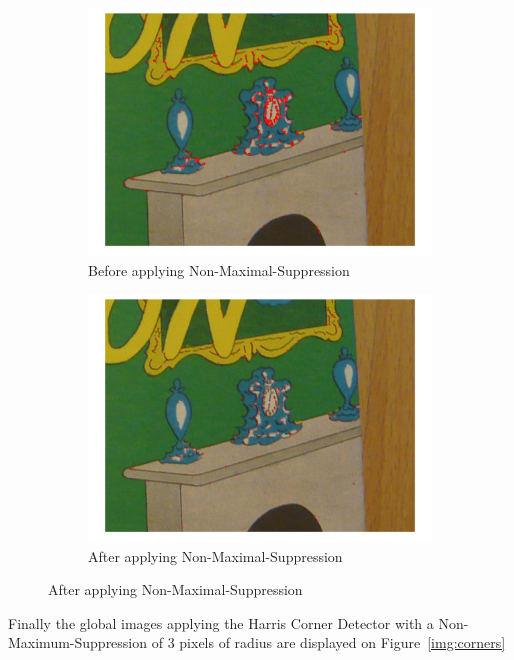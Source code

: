 \documentclass{ethz_report}
\begin{document}
\begin{figure}[H]
\centering
\begin{subfigure}[b]{.5\textwidth}
  \centering
  \includegraphics[width=1\linewidth]{images/harris_nms_before}
  \caption{Before applying Non-Maximal-Suppression}
\end{subfigure}%
\begin{subfigure}[b]{.5\textwidth}
  \centering
  \includegraphics[width=1\linewidth]{images/harris_nms_after}
  \caption{After applying Non-Maximal-Suppression}
\end{subfigure}
\end{figure}

Finally the global images applying the Harris Corner Detector with a Non-Maximum-Suppression of 3
pixels of radius are displayed on Figure~\ref{img:corners}
\end{document}
